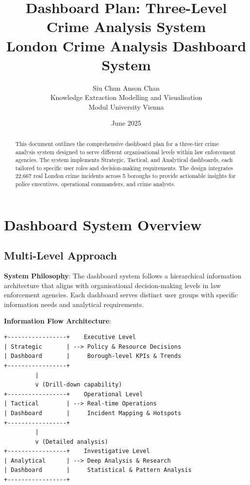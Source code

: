 \documentclass[12pt,a4paper]{article}
\title{\textbf{Dashboard Plan: Three-Level Crime Analysis System\\London Crime Analysis Dashboard System}}
\author{Siu Chun Anson Chan \\ Knowledge Extraction Modelling and Visualisation \\ Modul University Vienna}
\date{June 2025}
\begin{document}
\maketitle
\thispagestyle{fancy}

\begin{abstract}
This document outlines the comprehensive dashboard plan for a three-tier crime analysis system designed to serve different organisational levels within law enforcement agencies. The system implements Strategic, Tactical, and Analytical dashboards, each tailored to specific user roles and decision-making requirements. The design integrates 22,667 real London crime incidents across 5 boroughs to provide actionable insights for police executives, operational commanders, and crime analysts.
\end{abstract}

\tableofcontents
\newpage

\section{Dashboard System Overview}

\subsection{Multi-Level Approach}

\textbf{System Philosophy}: 
The dashboard system follows a hierarchical information architecture that aligns with organisational decision-making levels in law enforcement agencies. Each dashboard serves distinct user groups with specific information needs and analytical requirements.

\textbf{Information Flow Architecture}:
\begin{verbatim}
+-----------------+    Executive Level
| Strategic       | --> Policy & Resource Decisions
| Dashboard       |     Borough-level KPIs & Trends
+-----------------+
         |
         v (Drill-down capability)
+-----------------+    Operational Level  
| Tactical        | --> Real-time Operations
| Dashboard       |     Incident Mapping & Hotspots
+-----------------+
         |
         v (Detailed analysis)
+-----------------+    Investigative Level
| Analytical      | --> Deep Analysis & Research
| Dashboard       |     Statistical & Pattern Analysis
+-----------------+
\end{verbatim}
\end{document}
